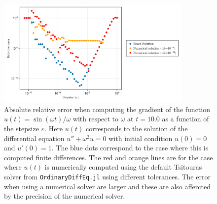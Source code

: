 \begin{figure}
    \centering
    \includegraphics[width=0.85\textwidth]{../code/finite_differences/finite_difference_derivative.pdf}
    \caption{Absolute relative error when computing the gradient of the function $u(t) = \sin (\omega t)/\omega$ with respect to $\omega$ at $t=10.0$ as a function of the stepsize $\varepsilon$. Here $u(t)$ corresponds to the solution of the differential equation $u'' + \omega^2 u = 0$ with initial condition $u(0)=0$ and $u'(0)=1$. The blue dots correspond to the case where this is computed finite differences. The red and orange lines are for the case where $u(t)$ is numerically computed using the default Tsitouras solver \cite{Tsitouras_2011} from \texttt{OrdinaryDiffEq.jl} using different tolerances. The error when using  a numerical solver are larger and these are also affercted by the precision of the numerical solver. }
    \label{fig:finite-diff}
\end{figure}